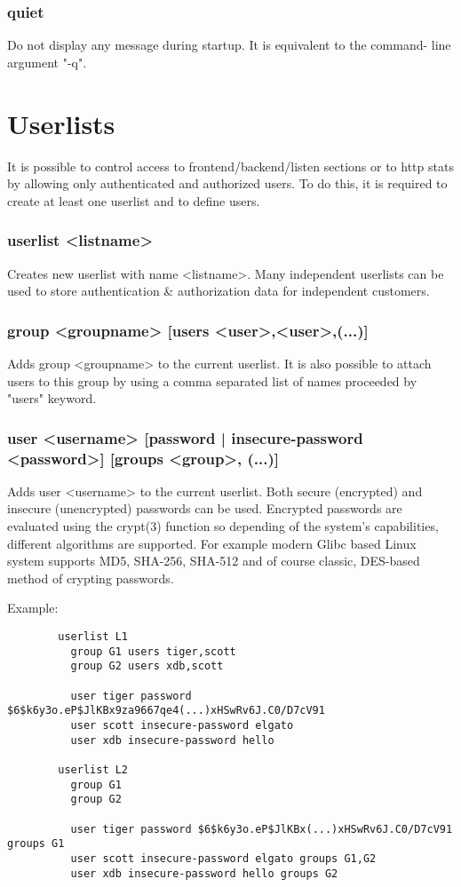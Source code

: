 \subsubsection[quiet]{quiet}
  Do not display any message during startup. It is equivalent to the command-
  line argument "-q".


\section{Userlists}
It is possible to control access to frontend/backend/listen sections or to
http stats by allowing only authenticated and authorized users. To do this,
it is required to create at least one userlist and to define users.

\subsubsection[userlist]{userlist <listname>}
  Creates new userlist with name <listname>. Many independent userlists can be
  used to store authentication \& authorization data for independent customers.

\subsubsection[group]{group <groupname> [users <user>,<user>,(...)]}
  Adds group <groupname> to the current userlist. It is also possible to
  attach users to this group by using a comma separated list of names
  proceeded by "users" keyword.

\subsubsection[user]{user <username> [password | insecure-password <password>]
  [groups <group>, (...)]}
  Adds user <username> to the current userlist. Both secure (encrypted) and
  insecure (unencrypted) passwords can be used. Encrypted passwords are
  evaluated using the crypt(3) function so depending of the system's
  capabilities, different algorithms are supported. For example modern Glibc
  based Linux system supports MD5, SHA-256, SHA-512 and of course classic,
  DES-based method of crypting passwords.

  Example:
\begin{verbatim}
        userlist L1
          group G1 users tiger,scott
          group G2 users xdb,scott

          user tiger password $6$k6y3o.eP$JlKBx9za9667qe4(...)xHSwRv6J.C0/D7cV91
          user scott insecure-password elgato
          user xdb insecure-password hello

        userlist L2
          group G1
          group G2

          user tiger password $6$k6y3o.eP$JlKBx(...)xHSwRv6J.C0/D7cV91 groups G1
          user scott insecure-password elgato groups G1,G2
          user xdb insecure-password hello groups G2
\end{verbatim}

